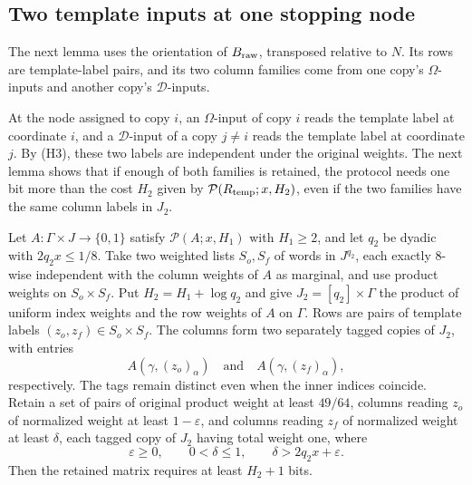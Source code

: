 \documentclass[11pt,letterpaper]{article} \usepackage[utf8]{inputenc}
\theoremstyle{plain} \newtheorem{theorem}{Theorem}[section]
\theoremstyle{definition} \newaliascnt{definition}{theorem}
\newcommand{\RP}[3]{\mathcal{P}(#1;#2,#3)}
\begin{document}
\subsection{Two template inputs at one stopping node}

The next lemma uses the orientation of $B_{\rm raw}$, transposed relative to $N$. Its rows
are template-label pairs, and its two column families come from one
copy's $\Omega$-inputs and another copy's $\mathcal D$-inputs.

At the node assigned to copy $i$, an $\Omega$-input of copy $i$ reads the
template label at coordinate $i$, and a $\mathcal D$-input of a copy $j\ne i$
reads the template label at coordinate $j$. By (H3), these two labels are
independent under the original weights. The next lemma shows that if enough of both
families is retained, the protocol needs one bit more than the cost $H_2$
given by $\RP{R_{\rm temp}}{x}{H_2}$, even if the two families have the
same column labels in $J_2$.

\begin{lemma}\label{res:paired}
Let $A:\Gamma\times J\to\{0,1\}$ satisfy $\RP{A}{x}{H_1}$ with $H_1\ge2$,
and let $q_2$ be dyadic with $2q_2x\le1/8$. Take two weighted lists $S_o,S_f$ of words in $J^{q_2}$, each
exactly $8$-wise independent with the column weights of $A$ as marginal, and use
product weights on $S_o\times S_f$. Put $H_2=H_1+\log q_2$ and give
$J_2=[q_2]\times\Gamma$ the product of uniform index weights and the row weights of $A$ on $\Gamma$.
Rows are pairs of template labels $(z_o,z_f)\in S_o\times S_f$. The columns form two separately tagged copies of $J_2$, with entries
\[
A(\gamma,(z_o)_\alpha)\quad\text{and}\quad
A(\gamma,(z_f)_\alpha),
\]
respectively. The tags remain distinct even when the inner indices coincide.
Retain a set of pairs of original product weight at least $49/64$, columns reading $z_o$
of normalized weight at least $1-\varepsilon$, and columns reading $z_f$ of
normalized weight at least $\delta$, each tagged copy of $J_2$ having total weight one, where
\[
\varepsilon\ge0,\qquad 0<\delta\le1,\qquad
\delta>2q_2x+\varepsilon.
\]
Then the retained matrix requires at least $H_2+1$ bits.
\end{lemma}
\end{document}

